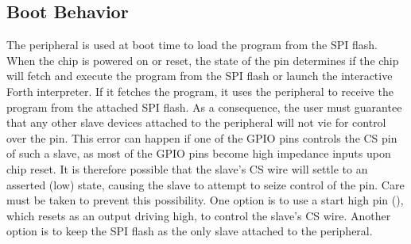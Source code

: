 \subsection{ Boot Behavior}

The  peripheral is used at boot time to load the program from the SPI flash. When the chip is powered on or reset, the state of the  pin determines if the chip will fetch and execute the program from the SPI flash or launch the interactive Forth interpreter. If it fetches the program, it uses the  peripheral to receive the program from the attached SPI flash. As a consequence, the user must guarantee that any other slave devices attached to the  peripheral will not vie for control over the  pin. This error can happen if one of the GPIO pins controls the CS pin of such a slave, as most of the GPIO pins become high impedance inputs upon chip reset. It is therefore possible that the slave's CS wire will settle to an asserted (low) state, causing the slave to attempt to seize control of the  pin. Care must be taken to prevent this possibility. One option is to use a start high pin (), which resets as an output driving high, to control the slave's CS wire. Another option is to keep the SPI flash as the only slave attached to the  peripheral.
